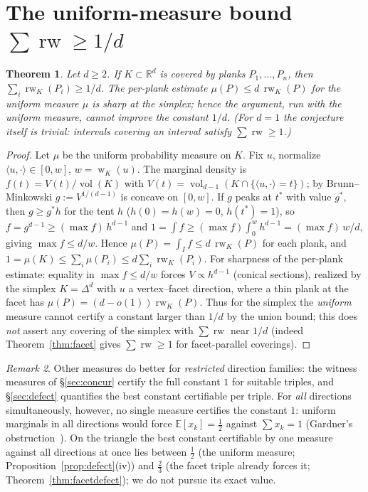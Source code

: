 \documentclass[11pt,reqno]{amsart}
\theoremstyle{plain}
\newtheorem{theorem}{Theorem}[section]
\theoremstyle{definition}
\theoremstyle{remark}
\newtheorem{remark}[theorem]{Remark}
\newcommand{\rw}{\operatorname{rw}}
\newcommand{\R}{\mathbb{R}}
\DeclareMathOperator{\wid}{w}
\DeclareMathOperator{\vol}{vol}
\begin{document}
\section{The uniform-measure bound $\sum\rw\ge 1/d$}\label{sec:measure}
\begin{theorem}\label{thm:oned}
Let $d\ge2$. If $K\subset\R^d$ is covered by planks $P_1,\dots,P_n$, then
$\sum_i\rw_K(P_i)\ge 1/d$. The per-plank estimate $\mu(P)\le d\,\rw_K(P)$ for the
uniform measure $\mu$ is sharp at the simplex; hence the argument, run with the
uniform measure, cannot improve the constant $1/d$. (For $d=1$ the conjecture
itself is trivial: intervals covering an interval satisfy $\sum\rw\ge1$.)
\end{theorem}
\begin{proof}
Let $\mu$ be the uniform probability measure on $K$. Fix $u$, normalize
$\langle u,\cdot\rangle\in[0,w]$, $w=\wid_K(u)$. The marginal density is
$f(t)=V(t)/\vol(K)$ with $V(t)=\vol_{d-1}(K\cap\{\langle u,\cdot\rangle=t\})$; by
Brunn--Minkowski $g:=V^{1/(d-1)}$ is concave on $[0,w]$. If $g$ peaks at $t^\ast$
with value $g^\ast$, then $g\ge g^\ast h$ for the tent $h$ ($h(0)=h(w)=0$,
$h(t^\ast)=1$), so $f=g^{d-1}\ge(\max f)\,h^{d-1}$ and
$1=\int f\ge(\max f)\int_0^w h^{d-1}=(\max f)\,w/d$, giving $\max f\le d/w$. Hence
$\mu(P)=\int_I f\le d\,\rw_K(P)$ for each plank, and
$1=\mu(K)\le\sum_i\mu(P_i)\le d\sum_i\rw_K(P_i)$. For sharpness of the per-plank
estimate: equality in $\max f\le d/w$ forces $V\propto h^{d-1}$ (conical sections),
realized by the simplex $K=\Delta^d$ with $u$ a vertex--facet direction, where a
thin plank at the facet has $\mu(P)=(d-o(1))\rw_K(P)$. Thus for the simplex the
\emph{uniform} measure cannot certify a constant larger than $1/d$ by the union
bound; this does \emph{not} assert any covering of the simplex with
$\sum\rw$ near $1/d$ (indeed Theorem~\ref{thm:facet} gives $\sum\rw\ge1$ for
facet-parallel coverings).
\end{proof}
\begin{remark}\label{rem:oneall}
Other measures do better for \emph{restricted} direction families: the witness
measures of \S\ref{sec:concur} certify the full constant $1$ for suitable triples,
and \S\ref{sec:defect} quantifies the best constant certifiable per triple. For
\emph{all} directions simultaneously, however, no single measure certifies the
constant $1$: uniform marginals in all directions would force
$\mathbb E[x_k]=\tfrac12$ against $\sum x_k=1$ (Gardner's
obstruction~\cite{Gardner88}). On the triangle the best constant certifiable by
one measure against all directions at once lies between $\tfrac12$ (the uniform
measure; Proposition~\ref{prop:defect}(iv)) and $\tfrac23$ (the facet triple
already forces it; Theorem~\ref{thm:facetdefect}); we do not pursue its exact
value.
\end{remark}
\end{document}
